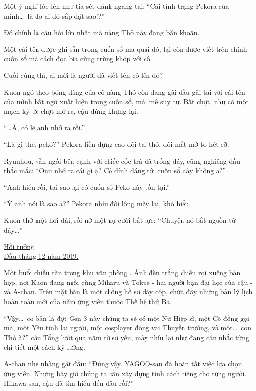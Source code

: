 \documentclass[../main.tex]{subfiles}
\begin{document}
Một ý nghĩ lóe lên như tia sét đánh ngang tai: ``Cái tình trạng Pekora của mình\dots\ là do ai đó sắp đặt sao!?''

Đó chính là câu hỏi lớn nhất mà nàng Thỏ này đang băn khoăn.

Một cái tên được ghi sẵn trong cuốn sổ ma quái đó, lại còn được viết trên chính cuốn sổ mà cách đọc bìa cũng trùng khớp với cô.

Cuối cùng thì, ai mới là người đã viết tên cô lên đó?
\omk

Kuon ngó theo bóng dáng của cô nàng Thỏ còn đang gãi đầu gãi tai với cái tên của mình bất ngờ xuất hiện trong cuốn sổ, mải mê suy tư. Bất chợt, như có một mạch ký ức chợt mở ra, cậu đứng khựng lại.

``\dots À, có lẽ anh nhớ ra rồi.''

``Là gì thế, peko?'' Pekora liền dựng cao đôi tai thỏ, đôi mắt mở to hết cỡ.

Ryuuhou, vẫn ngồi bên cạnh với chiếc cốc trà đã trống đáy, cũng nghiêng đầu thắc mắc: ``Onii nhớ ra cái gì ạ? Có dính dáng tới cuốn sổ này không ạ?''

``Anh hiểu rồi, tại sao lại có cuốn sổ Peko này tồn tại.''

``Ý anh nói là sao ạ?'' Pekora nhíu đôi lông mày lại, khó hiểu.

Kuon thở một hơi dài, rồi nở một nụ cười bất lực: ``Chuyện nó bắt nguồn từ đây\dots''

\begin{center}
  \uline{Hồi tưởng\\Đầu tháng 12 năm 2019.}
\end{center}

Một buổi chiều tàn trong khu văn phòng \hll. Ánh đèn trắng chiếu rọi xuống bàn họp, nơi Kuon đang ngồi cùng Miharu và Tokue - hai người bạn đại học của cậu - và A-chan. Trên mặt bàn là một chồng hồ sơ dày cộp, chứa đầy những bản lý lịch hoàn toàn mới của năm ứng viên thuộc Thế hệ thứ Ba.

``Vậy\dots\ cơ bản là đợt Gen 3 này chúng ta sẽ có một Nữ Hiệp sĩ, một Cô đồng gọi ma, một Yêu tinh lai người, một cosplayer đóng vai Thuyền trưởng, và một\dots\ con Thỏ à?'' cậu Tổng lướt qua năm tờ sơ yếu, mày nhíu lại như đang cân nhắc từng chi tiết một cách kỹ lưỡng.

A-chan nhẹ nhàng gật đầu: ``Đúng vậy. YAGOO-san đã hoàn tất việc lựa chọn ứng viên. Nhưng bây giờ chúng ta cần xây dựng tính cách riêng cho từng người. Hikawa-san, cậu đã tìm hiểu đến đâu rồi?''
\end{document}
